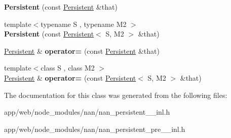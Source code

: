 \begin{DoxyCompactItemize}
{\bfseries Persistent} (const \hyperlink{class_persistent}{Persistent} \&that)
\item 
\mbox{\label{class_persistent_a2e21a6a3da23c35342925d633df076cb}} 
{\footnotesize template$<$typename S , typename M2 $>$ }\\{\bfseries Persistent} (const \hyperlink{class_persistent}{Persistent}$<$ S, M2 $>$ \&that)
\item 
\mbox{\label{class_persistent_a989f8767ca4ce766394827a86006ce70}} 
\hyperlink{class_persistent}{Persistent} \& {\bfseries operator=} (const \hyperlink{class_persistent}{Persistent} \&that)
\item 
\mbox{\label{class_persistent_aeac267c6c4470b00f7f06f9c9483e5b3}} 
{\footnotesize template$<$class S , class M2 $>$ }\\\hyperlink{class_persistent}{Persistent} \& {\bfseries operator=} (const \hyperlink{class_persistent}{Persistent}$<$ S, M2 $>$ \&that)
\end{DoxyCompactItemize}


The documentation for this class was generated from the following files\+:\begin{DoxyCompactItemize}
\item 
app/web/node\+\_\+modules/nan/nan\+\_\+persistent\+\_\+\_\+inl.\+h\item 
app/web/node\+\_\+modules/nan/nan\+\_\+persistent\+\_\+pre\+\_\+\_\+inl.\+h\end{DoxyCompactItemize}
